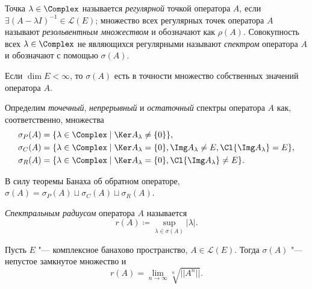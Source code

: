 \documentclass[main]{subfiles}
\begin{document}
\begin{definition}
  Точка \( \lambda \in \Complex \) называется \emph{регулярной}
  точкой оператора \( A \), если
  \( \exists (A - \lambda I)^{-1} \in \mathcal{L}(E) \);
  множество всех регулярных точек оператора \( A \)
  называют \emph{резольвентным множеством} и
  обозначают как \( \rho(A) \).
  Совокупность всех \( \lambda \in \Complex \)
  не являющихся регулярными
  называют \emph{спектром} оператора \( A \) и
  обозначают с помощью \( \sigma(A) \).
\end{definition}

\begin{remark}
  Если \( \dim E < \infty \),
  то \( \sigma(A) \) есть в точности
  множество собственных значений оператора \( A \).
\end{remark}

\begin{definition}
  Определим \emph{точечный}, \emph{непрерывный}
  и \emph{остаточный} спектры оператора \( A \) как,
  соответственно, множества
  \begin{align}
    \sigma_P(A) &= \{ \lambda \in \Complex \mid
      \Ker A_\lambda \ne \{ 0 \}
    \}, \\
    \sigma_C(A) &= \{ \lambda \in \Complex \mid
      \Ker A_\lambda = \{ 0 \}, \Img A_\lambda \ne E,
      \Cl{\Img A_\lambda} = E
    \}, \\
    \sigma_R(A) &= \{ \lambda \in \Complex \mid
      \Ker A_\lambda = \{ 0 \}, \Cl{\Img A_\lambda} \ne E
    \}. \\
  \end{align}
\end{definition}

\begin{remark}
  В силу теоремы Банаха об обратном операторе,
  \( \sigma(A) = \sigma_P(A) \sqcup \sigma_C(A) \sqcup \sigma_R(A) \).
\end{remark}

\begin{definition}
  \emph{Спектральным радиусом} оператора \( A \) называется
  \[
    r(A) \coloneqq \sup_{\lambda \in \sigma(A)} |\lambda|.
  \]
\end{definition}

\begin{theorem}\label{thm:spectrum}
  Пусть \( E \) "--- комплексное банахово пространство,
  \( A \in \mathcal{L}(E) \).
  Тогда \( \sigma(A) \) "--- непустое замкнутое множество
  и
  \[
    r(A) =
    \lim_{n \to \infty} \sqrt[n]{||A^n||}.
  \]
\end{theorem}
\end{document}
